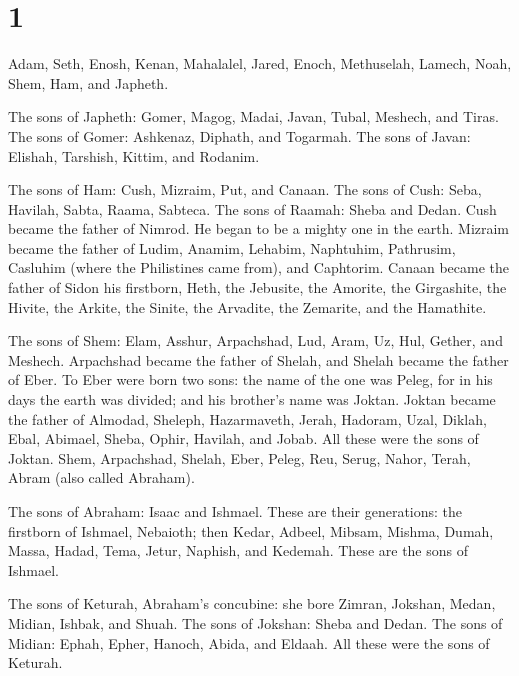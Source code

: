 \hypertarget{section}{%
\section{1}\label{section}}

 Adam, Seth, Enosh,  Kenan, Mahalalel, Jared,
 Enoch, Methuselah, Lamech,  Noah, Shem, Ham,
and Japheth.

 The sons of Japheth: Gomer, Magog, Madai, Javan, Tubal,
Meshech, and Tiras.  The sons of Gomer: Ashkenaz, Diphath,
and Togarmah.  The sons of Javan: Elishah, Tarshish, Kittim,
and Rodanim.

 The sons of Ham: Cush, Mizraim, Put, and Canaan.
 The sons of Cush: Seba, Havilah, Sabta, Raama, Sabteca. The
sons of Raamah: Sheba and Dedan.  Cush became the father of
Nimrod. He began to be a mighty one in the earth.  Mizraim
became the father of Ludim, Anamim, Lehabim, Naphtuhim, 
Pathrusim, Casluhim (where the Philistines came from), and Caphtorim.
 Canaan became the father of Sidon his firstborn, Heth,
 the Jebusite, the Amorite, the Girgashite, 
the Hivite, the Arkite, the Sinite,  the Arvadite, the
Zemarite, and the Hamathite.

 The sons of Shem: Elam, Asshur, Arpachshad, Lud, Aram, Uz,
Hul, Gether, and Meshech.  Arpachshad became the father of
Shelah, and Shelah became the father of Eber.  To Eber were
born two sons: the name of the one was Peleg, for in his days the earth
was divided; and his brother's name was Joktan.  Joktan
became the father of Almodad, Sheleph, Hazarmaveth, Jerah, 
Hadoram, Uzal, Diklah,  Ebal, Abimael, Sheba, 
Ophir, Havilah, and Jobab. All these were the sons of Joktan.
 Shem, Arpachshad, Shelah,  Eber, Peleg, Reu,
 Serug, Nahor, Terah,  Abram (also called
Abraham).

 The sons of Abraham: Isaac and Ishmael. 
These are their generations: the firstborn of Ishmael, Nebaioth; then
Kedar, Adbeel, Mibsam,  Mishma, Dumah, Massa, Hadad, Tema,
 Jetur, Naphish, and Kedemah. These are the sons of
Ishmael.

 The sons of Keturah, Abraham's concubine: she bore Zimran,
Jokshan, Medan, Midian, Ishbak, and Shuah. The sons of Jokshan: Sheba
and Dedan.  The sons of Midian: Ephah, Epher, Hanoch,
Abida, and Eldaah. All these were the sons of Keturah.

